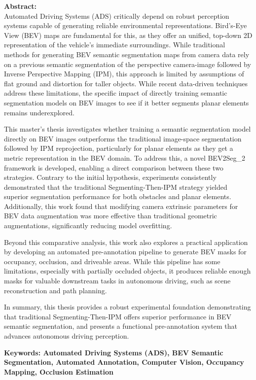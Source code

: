 \begin{itshape}
    \textbf{Abstract:} \\

Automated Driving Systems (ADS) critically depend on robust perception systems capable of generating reliable environmental representations. Bird's-Eye View (BEV) maps are fundamental for this, as they offer an unified, top-down 2D representation of the vehicle's immediate surroundings. While traditional methods for generating BEV semantic segmentation maps from camera data rely on a previous semantic segmentation of the perspective camera-image followed by Inverse Perspective Mapping (IPM), this approach is limited by assumptions of flat ground and distortion for taller objects. While recent data-driven techniques address these limitations, the specific impact of directly training semantic segmentation models on BEV images to see if it better segments planar elements remains underexplored.

This master's thesis investigates whether training a semantic segmentation model directly on BEV images outperforms the traditional image-space segmentation followed by IPM reprojection, particularly for planar elements as they get a metric representation in the BEV domain. To address this, a novel BEV2Seg\_2 framework is developed, enabling a direct comparison between these two strategies. Contrary to the initial hypothesis, experiments consistently demonstrated that the traditional Segmenting-Then-IPM strategy yielded superior segmentation performance for both obstacles and planar elements. Additionally, this work found that modifying camera extrinsic parameters for BEV data augmentation was more effective than traditional geometric augmentations, significantly reducing model overfitting.

Beyond this comparative analysis, this work also explores a practical application by developing an automated pre-annotation pipeline to generate BEV masks for occupancy, occlusion, and driveable areas.  While this pipeline has some limitations, especially with partially occluded objects, it produces reliable enough masks for valuable downstream tasks in autonomous driving, such as scene reconstruction and path planning. 

In summary, this thesis provides a robust experimental foundation demonstrating that traditional Segmenting-Then-IPM offers superior performance in BEV semantic segmentation, and presents a functional pre-annotation system that advances autonomous driving perception.

    \textbf{Keywords: Automated Driving Systems (ADS), BEV Semantic Segmentation, Automated Annotation, Computer Vision, Occupancy Mapping, Occlusion Estimation}
\end{itshape}
\newpage
